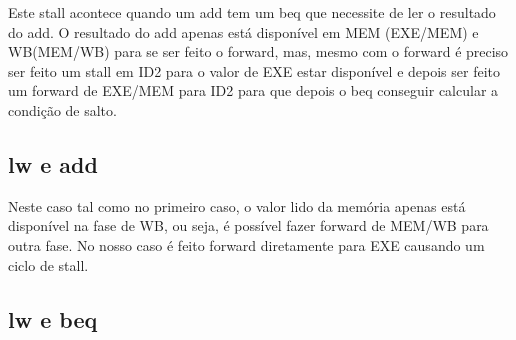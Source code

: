 \documentclass[pdftex,12pt,a4paper]{report}
\begin{document}
Este stall acontece quando um add tem um beq que necessite de ler o resultado do add. O resultado do add apenas está disponível em MEM (EXE/MEM) e WB(MEM/WB) para se ser feito o forward, mas, mesmo com o forward é preciso ser feito um stall em ID2 para o valor de EXE estar disponível e depois ser feito um forward de EXE/MEM para ID2 para que depois o beq conseguir calcular a condição de salto.

\subsection{lw e add}
\begin{table}[!htb]
\centering
\label{my-label}
\end{table}

Neste caso tal como no primeiro caso, o valor lido da memória apenas está disponível na fase de WB, ou seja, é possível fazer forward de MEM/WB para outra fase. No nosso caso é feito forward diretamente para EXE causando um ciclo de stall. 

\subsection{lw e beq}
\begin{table}[!htb]
\centering
\label{my-label}
\end{table}
\end{document}
